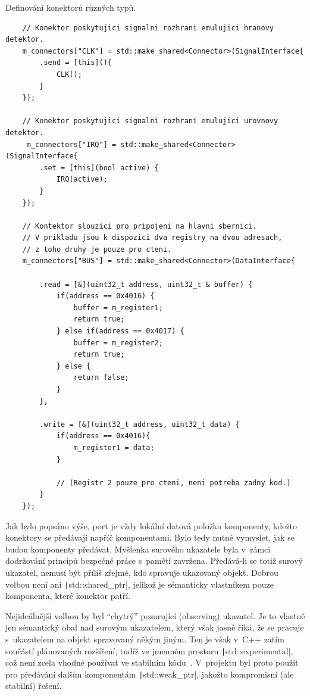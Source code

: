 \begin{listing}
	\caption{Definování konektorů různých typů.}
	\label{list:use-konfigurace-konektoru}
	\begin{verbatim}
	// Konektor poskytujici signalni rozhrani emulujici hranovy detektor.
    m_connectors["CLK"] = std::make_shared<Connector>(SignalInterface{
		.send = [this](){
			CLK();
		}
	});
	
	// Konektor poskytujici signalni rozhrani emulujici urovnovy detektor.
	 m_connectors["IRQ"] = std::make_shared<Connector>(SignalInterface{
		.set = [this](bool active) {
			IRQ(active);
		}
	});
	
	// Kontektor slouzici pro pripojeni na hlavni sbernici.
	// V prikladu jsou k dispozici dva registry na dvou adresach,
	// z toho druhy je pouze pro cteni.
	m_connectors["BUS"] = std::make_shared<Connector>(DataInterface{

		.read = [&](uint32_t address, uint32_t & buffer) {
			if(address == 0x4016) {
				buffer = m_register1;
				return true;
			} else if(address == 0x4017) {
				buffer = m_register2;
				return true;
			} else {
				return false;
			}
		},
	
		.write = [&](uint32_t address, uint32_t data) {
			if(address == 0x4016){
				m_register1 = data;
			}
		
			// (Registr 2 pouze pro cteni, neni potreba zadny kod.)
		}
	});
	\end{verbatim}
\end{listing}

\begin{note}
	Jak bylo popsáno výše, port je vždy lokální datová položka komponenty, kdežto konektory se předávají napříč komponentami. Bylo tedy nutné vymyslet, jak se budou komponenty předávat. Myšlenka surového ukazatele byla v~rámci dodržování principů bezpečné práce s~pamětí zavržena. Předává-li se totiž surový ukazatel, nemusí být příliš zřejmé, kdo spravuje ukazovaný objekt. Dobrou volbou není ani \texttt|std::shared_ptr|, jelikož je sémanticky vlastníkem pouze komponenta, které konektor patří.
	
	 Nejideálnější volbou by byl \enquote{chytrý} pozorující (observing) ukazatel. Je to vlastně jen sémantický obal nad surovým ukazatelem, který však jasně říká, že se pracuje s~ukazatelem na objekt spravovaný někým jiným. Ten je však v~C++ zatím součástí plánovaných rozšíření, tudíž ve jmenném prostoru \texttt|std::experimental|, což není zcela vhodné používat ve stabilním kódu~. V~projektu byl proto použit pro předávání dalším komponentám \texttt|std::weak_ptr|, jakožto kompromisní (ale stabilní) řešení.
\end{note}

